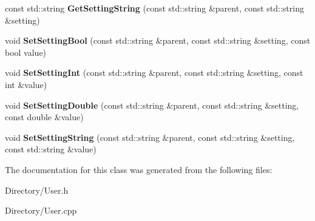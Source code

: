 \begin{DoxyCompactItemize}
\item 
\mbox{\label{classUserManager_aba0bac6b11200df59d203bf0f231311c}} 
const std\+::string {\bfseries Get\+Setting\+String} (const std\+::string \&parent, const std\+::string \&setting)
\item 
\mbox{\label{classUserManager_a304479e971d5b7ec88378341cee96453}} 
void {\bfseries Set\+Setting\+Bool} (const std\+::string \&parent, const std\+::string \&setting, const bool value)
\item 
\mbox{\label{classUserManager_acfcb6c08b87ce61e86d88dbde2ca3357}} 
void {\bfseries Set\+Setting\+Int} (const std\+::string \&parent, const std\+::string \&setting, const int \&value)
\item 
\mbox{\label{classUserManager_a0fdb64ec69bd8d78099e2cf7babe783b}} 
void {\bfseries Set\+Setting\+Double} (const std\+::string \&parent, const std\+::string \&setting, const double \&value)
\item 
\mbox{\label{classUserManager_a4439680052819df67275c1f106cce7ba}} 
void {\bfseries Set\+Setting\+String} (const std\+::string \&parent, const std\+::string \&setting, const std\+::string \&value)
\end{DoxyCompactItemize}


The documentation for this class was generated from the following files\+:\begin{DoxyCompactItemize}
\item 
Directory/User.\+h\item 
Directory/User.\+cpp\end{DoxyCompactItemize}
